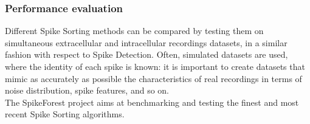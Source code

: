 \subsubsection{Performance evaluation}
Different Spike Sorting methods can be compared by testing them on simultaneous
extracellular and intracellular recordings datasets, in a similar fashion with respect
to Spike Detection. Often, simulated datasets are used, where the identity of each
spike is known: it is important to create datasets that mimic as accurately as possible
the characteristics of real recordings in terms of noise distribution, spike features,
and so on.\\
The SpikeForest project aims at benchmarking and testing the finest and most recent
Spike Sorting algorithms.
